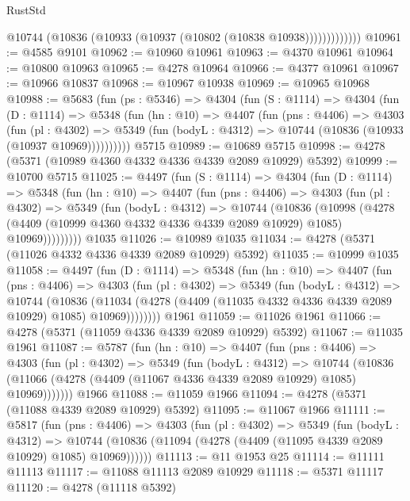 \begin{lexlean}{RustStd}
\begin{coremodule}
                  @10744 (@10836 (@10933 (@10937 (@10802 (@10838 @10938)))))))))))))
@10961 := @4585 @9101
@10962 := @10960 @10961
@10963 := @4370 @10961
@10964 := @10800 @10963
@10965 := @4278 @10964
@10966 := @4377 @10961
@10967 := @10966 @10837
@10968 := @10967 @10938
@10969 := @10965 @10968
@10988 := @5683
    (fun (ps : @5346) =>
    @4304
      (fun (S : @1114) =>
      @4304
        (fun (D : @1114) =>
        @5348
          (fun (hn : @10) =>
          @4407
            (fun (pns : @4406) =>
            @4303
              (fun (pl : @4302) =>
              @5349 (fun (bodyL : @4312) => @10744 (@10836 (@10933 (@10937 @10969))))))))))
    @5715
@10989 := @10689 @5715
@10998 := @4278 (@5371 (@10989 @4360 @4332 @4336 @4339 @2089 @10929) @5392)
@10999 := @10700 @5715
@11025 := @4497
    (fun (S : @1114) =>
    @4304
      (fun (D : @1114) =>
      @5348
        (fun (hn : @10) =>
        @4407
          (fun (pns : @4406) =>
          @4303
            (fun (pl : @4302) =>
            @5349
              (fun (bodyL : @4312) =>
              @10744
                (@10836
                  (@10998
                    (@4278
                      (@4409 (@10999 @4360 @4332 @4336 @4339 @2089 @10929) @1085)
                      @10969)))))))))
    @1035
@11026 := @10989 @1035
@11034 := @4278 (@5371 (@11026 @4332 @4336 @4339 @2089 @10929) @5392)
@11035 := @10999 @1035
@11058 := @4497
    (fun (D : @1114) =>
    @5348
      (fun (hn : @10) =>
      @4407
        (fun (pns : @4406) =>
        @4303
          (fun (pl : @4302) =>
          @5349
            (fun (bodyL : @4312) =>
            @10744
              (@10836
                (@11034 (@4278 (@4409 (@11035 @4332 @4336 @4339 @2089 @10929) @1085) @10969))))))))
    @1961
@11059 := @11026 @1961
@11066 := @4278 (@5371 (@11059 @4336 @4339 @2089 @10929) @5392)
@11067 := @11035 @1961
@11087 := @5787
    (fun (hn : @10) =>
    @4407
      (fun (pns : @4406) =>
      @4303
        (fun (pl : @4302) =>
        @5349
          (fun (bodyL : @4312) =>
          @10744
            (@10836 (@11066 (@4278 (@4409 (@11067 @4336 @4339 @2089 @10929) @1085) @10969)))))))
    @1966
@11088 := @11059 @1966
@11094 := @4278 (@5371 (@11088 @4339 @2089 @10929) @5392)
@11095 := @11067 @1966
@11111 := @5817
    (fun (pns : @4406) =>
    @4303
      (fun (pl : @4302) =>
      @5349
        (fun (bodyL : @4312) =>
        @10744 (@10836 (@11094 (@4278 (@4409 (@11095 @4339 @2089 @10929) @1085) @10969))))))
@11113 := @11 @1953 @25
@11114 := @11111 @11113
@11117 := @11088 @11113 @2089 @10929
@11118 := @5371 @11117
@11120 := @4278 (@11118 @5392)

\end{coremodule}
\end{lexlean}
